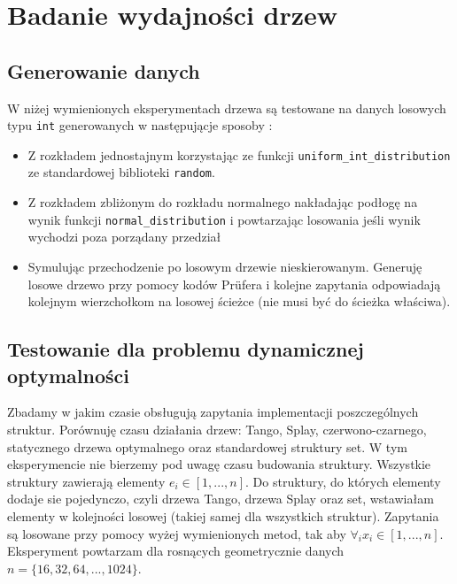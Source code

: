 \documentclass[declaration,shortabstract]{iithesis}
\theoremstyle{thm}
\theoremstyle{remark}
\theoremstyle{plain}
\theoremstyle{plain}
\theoremstyle{plain}
\begin{document}
\chapter{Badanie wydajności drzew}
\section{Generowanie danych}
W niżej wymienionych eksperymentach drzewa są testowane na danych losowych typu \texttt{int} generowanych w następującje sposoby : 
\begin{itemize}
\item{Z rozkładem jednostajnym korzystając ze funkcji \texttt{uniform\_int\_distribution} ze standardowej biblioteki \texttt{random}.}
\item{Z rozkładem zbliżonym do rozkładu normalnego nakładając podłogę na wynik funkcji \texttt{normal\_distribution} i powtarzając losowania jeśli wynik wychodzi poza porządany przedział}
\item{Symulując przechodzenie po losowym drzewie nieskierowanym. Generuję losowe drzewo przy pomocy kodów Prüfera i kolejne zapytania odpowiadają kolejnym wierzchołkom na losowej ścieżce (nie musi być do ścieżka właściwa).}
\end{itemize}

\section{Testowanie dla problemu dynamicznej optymalności}
Zbadamy w jakim czasie obsługują zapytania implementacji poszczególnych struktur. Porównuję czasu działania drzew: Tango, Splay, czerwono-czarnego, statycznego drzewa optymalnego oraz standardowej struktury set. W tym eksperymencie nie bierzemy pod uwagę czasu budowania struktury. Wszystkie struktury zawierają elementy \(e_i \in [1, ..., n]\). Do struktury, do których elementy dodaje sie pojedynczo, czyli drzewa Tango, drzewa Splay oraz set, wstawiałam elementy w kolejności losowej (takiej samej dla wszystkich struktur). Zapytania są losowane przy pomocy wyżej wymienionych metod, tak aby \(\forall_i x_i \in [1, ..., n]\). Eksperyment powtarzam dla rosnących geometrycznie danych \( n = \{16, 32, 64, ..., 1024\}\). 


%

\begin{thebibliography}{references}



\end{thebibliography}
\end{document}
